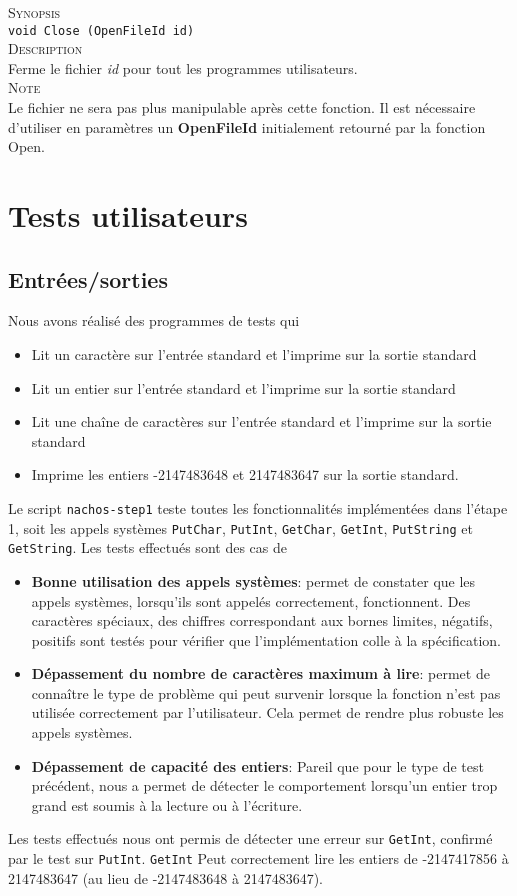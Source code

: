 \documentclass{report}
\begin{document}
\textsc{Synopsis}\\	
	\texttt{void Close (OpenFileId id)}\\
	
\textsc{Description}\\
	Ferme le fichier \textit{id} pour tout les programmes utilisateurs.  \\	
	
\textsc{Note}\\
	Le fichier ne sera pas plus manipulable après cette fonction. Il est nécessaire d'utiliser en paramètres un \textbf{OpenFileId} initialement retourné par la fonction Open.\\	
	
	
\section*{Tests utilisateurs}
\subsection*{Entrées/sorties}
Nous avons réalisé des programmes de tests qui
\begin{itemize}
 \item Lit un caractère sur l'entrée standard et l'imprime sur la sortie standard
 \item Lit un entier sur l'entrée standard et l'imprime sur la sortie standard
 \item Lit une chaîne de caractères sur l'entrée standard et l'imprime sur la sortie
 standard
 \item Imprime les entiers -2147483648 et 2147483647 sur la sortie standard.
\end{itemize}
Le script \texttt{nachos-step1} teste toutes les fonctionnalités implémentées dans l'étape 1, soit les appels systèmes \texttt{PutChar}, \texttt{PutInt}, \texttt{GetChar}, \texttt{GetInt}, \texttt{PutString} et \texttt{GetString}.
Les tests effectués sont des cas de
\begin{itemize}
 \item \textbf{Bonne utilisation des appels systèmes}: permet de constater que les appels systèmes, lorsqu'ils sont appelés correctement, fonctionnent. Des caractères spéciaux, des chiffres correspondant aux bornes limites, négatifs, positifs sont testés pour vérifier que l'implémentation colle à la spécification.
 \item \textbf{Dépassement du nombre de caractères maximum à lire}: permet de connaître le type de problème qui peut survenir lorsque la fonction n'est pas utilisée correctement par l'utilisateur. Cela permet de rendre plus robuste les appels systèmes.
 \item \textbf{Dépassement de capacité des entiers}: Pareil que pour le type de test précédent, nous a permet de détecter le comportement lorsqu'un entier trop grand est soumis à la lecture ou à l'écriture.
\end{itemize}
Les tests effectués nous ont permis de détecter une erreur sur \texttt{GetInt}, confirmé par le test sur \texttt{PutInt}. \texttt{GetInt} Peut correctement lire les entiers de -2147417856 à 2147483647 (au lieu de -2147483648 à 2147483647).
\end{document}
